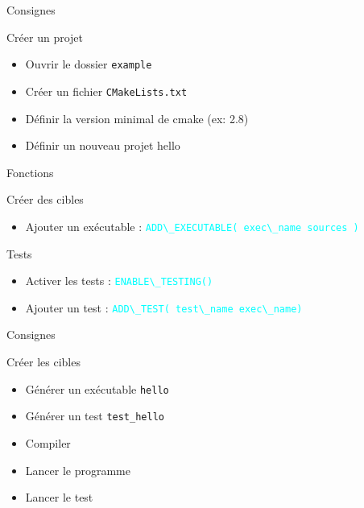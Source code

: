 \documentclass{beamer}
\begin{document}
\begin{frame}[fragile]{Consignes}

  \begin{exampleblock}{Créer un projet}
    \begin{itemize}
    \item Ouvrir le dossier \verb?example?
    \item Créer un fichier \verb?CMakeLists.txt?
    \item Définir la version minimal de cmake (ex: 2.8)
	\item Définir un nouveau projet \og hello \fg
    \end{itemize}
  \end{exampleblock}

\end{frame}


\begin{frame}[fragile]{Fonctions}
  \begin{block}{Créer des cibles}
    \begin{itemize}
    \item Ajouter un exécutable :\linebreak
      \textcolor{cyan}{\verb?ADD\_EXECUTABLE( exec\_name sources )?}
    \end{itemize}
  \end{block}

  \begin{block}{Tests}
    \begin{itemize}
    \item Activer les tests :\linebreak
      \textcolor{cyan}{\verb?ENABLE\_TESTING()?}
    \item Ajouter un test :\linebreak
      \textcolor{cyan}{\verb?ADD\_TEST( test\_name exec\_name) ?}
    \end{itemize}
  \end{block}
\end{frame}

\begin{frame}[fragile]{Consignes}
  \begin{exampleblock}{Créer les cibles}
    \begin{itemize}
    \item Générer un exécutable \verb?hello?
    \item Générer un test \verb?test_hello?
    \item Compiler
    \item Lancer le programme
    \item Lancer le test
    \end{itemize}
  \end{exampleblock}
\end{frame}
\end{document}
